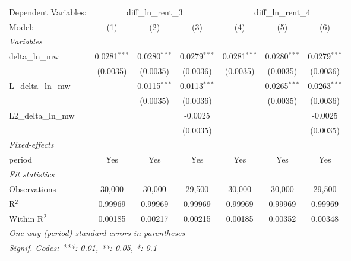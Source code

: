 \begin{tabular}{lcccccc}
\tabularnewline\toprule\toprule
Dependent Variables:&\multicolumn{3}{c}{diff\_ln\_rent\_3}&\multicolumn{3}{c}{diff\_ln\_rent\_4}\\
Model:&(1) & (2) & (3) & (4) & (5) & (6)\\
\midrule
\emph{Variables}&  & & & & & \\
delta\_ln\_mw&0.0281$^{***}$&0.0280$^{***}$&0.0279$^{***}$&0.0281$^{***}$&0.0280$^{***}$&0.0279$^{***}$\\
  &(0.0035)&(0.0035)&(0.0036)&(0.0035)&(0.0035)&(0.0036)\\
L\_delta\_ln\_mw&  &0.0115$^{***}$&0.0113$^{***}$&  &0.0265$^{***}$&0.0263$^{***}$\\
  &  &(0.0035)&(0.0036)&  &(0.0035)&(0.0036)\\
L2\_delta\_ln\_mw&  &  &-0.0025&  &  &-0.0025\\
  &  &  &(0.0035)&  &  &(0.0035)\\
\midrule
\emph{Fixed-effects}&  & & & & & \\
period&Yes&Yes&Yes&Yes&Yes&Yes\\
\midrule
\emph{Fit statistics}&  & & & & & \\
Observations& 30,000&30,000&29,500&30,000&30,000&29,500\\
R$^2$ & 0.99969&0.99969&0.99969&0.99969&0.99969&0.99969\\
Within R$^2$ & 0.00185&0.00217&0.00215&0.00185&0.00352&0.00348\\
\bottomrule\bottomrule
\multicolumn{7}{l}{\emph{One-way (period) standard-errors in parentheses}}\\
\multicolumn{7}{l}{\emph{Signif. Codes: ***: 0.01, **: 0.05, *: 0.1}}\\
\end{tabular}

